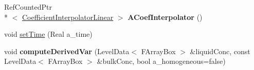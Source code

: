 \begin{DoxyCompactItemize}
\item 
\hypertarget{class_a_m_r_liquid_conc_op_a444171e12df4a8fadb324349a98088df}{Ref\-Counted\-Ptr\\*
$<$ \hyperlink{class_coefficient_interpolator_linear}{Coefficient\-Interpolator\-Linear} $>$ {\bfseries A\-Coef\-Interpolator} ()}\label{class_a_m_r_liquid_conc_op_a444171e12df4a8fadb324349a98088df}

\item 
void \hyperlink{class_a_m_r_liquid_conc_op_ab82a2cf085809b4671cbd2c689084b2d}{set\-Time} (Real a\-\_\-time)
\item 
\hypertarget{class_a_m_r_liquid_conc_op_aa95cc2a7a28dc22726c4a188630ea9fd}{void {\bfseries compute\-Derived\-Var} (Level\-Data$<$ F\-Array\-Box $>$ \&liquid\-Conc, const Level\-Data$<$ F\-Array\-Box $>$ \&bulk\-Conc, bool a\-\_\-homogeneous=false)}\label{class_a_m_r_liquid_conc_op_aa95cc2a7a28dc22726c4a188630ea9fd}

\end{DoxyCompactItemize}
